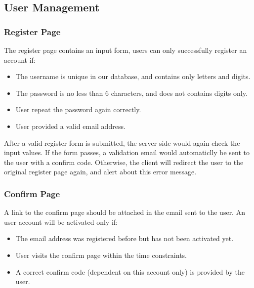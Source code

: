 
\subsection{User Management}

\subsubsection{Register Page}

The register page contains an input form, users can only successfully
register an account if:

\begin{itemize}
\itemsep1pt\parskip0pt
\item
  The username is unique in our database, and contains only letters and
  digits.
\item
  The password is no less than 6 characters, and does not contains
  digits only.
\item
  User repeat the password again correctly.
\item
  User provided a valid email address.
\end{itemize}

After a valid register form is submitted, the server side would again
check the input values. If the form passes, a validation email would
automaticlly be sent to the user with a confirm code. Otherwise, the
client will redirect the user to the original register page again, and
alert about this error message.

\subsubsection{Confirm Page}

A link to the confirm page should be attached in the email sent to the
user. An user account will be activated only if:

\begin{itemize}
\itemsep1pt\parskip0pt
\item
  The email address was registered before but has not been activated
  yet.
\item
  User visits the confirm page within the time constraints.
\item
  A correct confirm code (dependent on this account only) is provided by
  the user.
\end{itemize}

